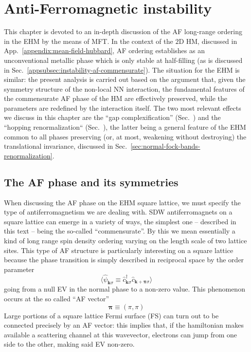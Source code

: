 \def\GraphicsFolder{parts/mft-analysis/chapters/antiferromagnetic-instability/pictures}
\chapter{Anti-Ferromagnetic instability}\label{chap:mft-af-instability}

This chapter is devoted to an in-depth discussion of the AF long-range ordering in the EHM by the means of MFT. In the context of the $2$D HM, discussed in App.~\ref{appendix:mean-field-hubbard}, AF ordering establishes as an unconventional metallic phase which is only stable at half-filling (as is discussed in Sec.~\ref{appsubsec:instability-af-commensurate}). The situation for the EHM is similar: the present analysis is carried out based on the argument that, given the symmetry structure of the non-local NN interaction, the fundamental features of the commensurate AF phase of the HM are effectively preserved, while the parameters are redefined by the interaction itself. The two most relevant effects we discuss in this chapter are the ``gap complexification'' (Sec.~\mref) and the ``hopping renormalization`` (Sec.~\mref), the latter being a general feature of the EHM common to all phases preserving (or, at most, weakening without destroying) the translational invariance, discussed in Sec.~\ref{sec:normal-fock-bands-renormalization}.

\section{The AF phase and its symmetries}\label{sec:af-phase-theory}

When discussing the AF phase on the EHM square lattice, we must specify the type of antiferromagnetism we are dealing with. SDW antiferromagnets on a square lattice can emerge in a variety of ways, the simplest one -- described in this text -- being the so-called ``commensurate''. By this we mean essentially a kind of long range spin density ordering varying on the length scale of two lattice sites. This type of AF structure is particularly interesting on a square lattice because the phase transition is simply described in reciprocal space by the order parameter 
\[
	\langle
		\hat \psi_{\mathbf{k}\sigma} \equiv \hat c_{\mathbf{k}\sigma}^\dagger \hat c_{\mathbf{k}+\bm{\pi}\sigma}
	\rangle
\]
going from a null EV in the normal phase to a non-zero value. This phenomenon occurs at the so called ``AF vector''
\[
	\bm{\pi} \equiv (\pi,\pi)
\]
Large portions of a square lattice Fermi surface (FS) can turn out to be connected precisely by an AF vector: this implies that, if the hamiltonian makes available a scattering channel at this wavevector, electrons can jump from one side to the other, making said EV non-zero.

